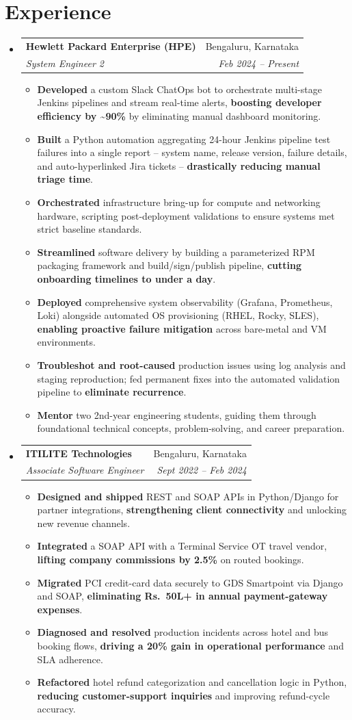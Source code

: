 \documentclass[a4paper,11pt]{article}
\makeatletter
\newcommand{\resumeItemWithoutTitle}[1]{
  \item\small{
    {#1 \vspace{-2pt}}
  }
}
\newcommand{\resumeSubheading}[4]{
  \vspace{-1pt}\item
    \begin{tabular*}{0.97\textwidth}{l@{\extracolsep{\fill}}r}
      \textbf{#1} & #2 \\
      \textit{#3} & \textit{#4} \\
    \end{tabular*}\vspace{-5pt}
}
\newcommand{\resumeSubHeadingListStart}{\begin{itemize}[leftmargin=*]}
\newcommand{\resumeSubHeadingListEnd}{\end{itemize}}
\newcommand{\resumeItemListStart}{\begin{itemize}}
\newcommand{\resumeItemListEnd}{\end{itemize}\vspace{-5pt}}
\makeatother
\begin{document}
\section{Experience}
  \resumeSubHeadingListStart
    \resumeSubheading
      {Hewlett Packard Enterprise (HPE)}{Bengaluru, Karnataka}
      {System Engineer 2}{Feb 2024 -- Present}
      \resumeItemListStart
        \resumeItemWithoutTitle{\textbf{Developed} a custom Slack ChatOps bot to orchestrate multi-stage Jenkins pipelines and stream real-time alerts, \textbf{boosting developer efficiency by \textasciitilde90\%} by eliminating manual dashboard monitoring.}
        \resumeItemWithoutTitle{\textbf{Built} a Python automation aggregating 24-hour Jenkins pipeline test failures into a single report -- system name, release version, failure details, and auto-hyperlinked Jira tickets -- \textbf{drastically reducing manual triage time}.}
        \resumeItemWithoutTitle{\textbf{Orchestrated} infrastructure bring-up for compute and networking hardware, scripting post-deployment validations to ensure systems met strict baseline standards.}
        \resumeItemWithoutTitle{\textbf{Streamlined} software delivery by building a parameterized RPM packaging framework and build/sign/publish pipeline, \textbf{cutting onboarding timelines to under a day}.}
        \resumeItemWithoutTitle{\textbf{Deployed} comprehensive system observability (Grafana, Prometheus, Loki) alongside automated OS provisioning (RHEL, Rocky, SLES), \textbf{enabling proactive failure mitigation} across bare-metal and VM environments.}
        \resumeItemWithoutTitle{\textbf{Troubleshot and root-caused} production issues using log analysis and staging reproduction; fed permanent fixes into the automated validation pipeline to \textbf{eliminate recurrence}.}
        \resumeItemWithoutTitle{\textbf{Mentor} two 2nd-year engineering students, guiding them through foundational technical concepts, problem-solving, and career preparation.}
      \resumeItemListEnd

    \resumeSubheading
      {ITILITE Technologies}{Bengaluru, Karnataka}
      {Associate Software Engineer}{Sept 2022 -- Feb 2024}
      \resumeItemListStart
        \resumeItemWithoutTitle{\textbf{Designed and shipped} REST and SOAP APIs in Python/Django for partner integrations, \textbf{strengthening client connectivity} and unlocking new revenue channels.}
        \resumeItemWithoutTitle{\textbf{Integrated} a SOAP API with a Terminal Service OT travel vendor, \textbf{lifting company commissions by 2.5\%} on routed bookings.}
        \resumeItemWithoutTitle{\textbf{Migrated} PCI credit-card data securely to GDS Smartpoint via Django and SOAP, \textbf{eliminating Rs.~50L+ in annual payment-gateway expenses}.}
        \resumeItemWithoutTitle{\textbf{Diagnosed and resolved} production incidents across hotel and bus booking flows, \textbf{driving a 20\% gain in operational performance} and SLA adherence.}
        \resumeItemWithoutTitle{\textbf{Refactored} hotel refund categorization and cancellation logic in Python, \textbf{reducing customer-support inquiries} and improving refund-cycle accuracy.}
      \resumeItemListEnd
  \resumeSubHeadingListEnd
\end{document}
